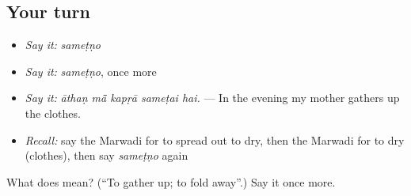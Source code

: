 \subsection*{Your turn}
\begin{itemize}
\raggedright
  \item \emph{Say it:} \emph{sameṭṇo}
  \item \emph{Say it:} \emph{sameṭṇo}, once more
  \item \emph{Say it:} \emph{āthaṇ mā̃ kapṛā sameṭai hai.} — In the evening my mother gathers up the clothes.
  \item \emph{Recall:} say the Marwadi for to spread out to dry, then the Marwadi for to dry (clothes), then say \emph{sameṭṇo} again
\end{itemize}

\begin{tcolorbox}[breakable,colback=teal!4,colframe=teal!35!black,title={Before you move on}]
What does  mean? (\textquotedblleft{}To gather up; to fold away\textquotedblright{}.) Say it once more.
\end{tcolorbox}
